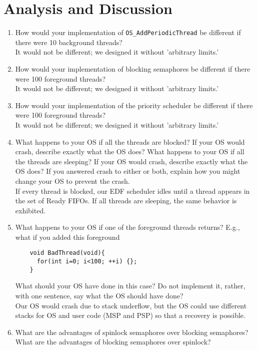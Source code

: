 \documentclass[12pt]{article}
\begin{document}
\section{Analysis and Discussion}

\begin{enumerate}[1)]
\item How would your implementation of \verb|OS_AddPeriodicThread| be
  different if there were 10 background threads? \\
  It would not be different; we designed it without 'arbitrary limits.'
\item How would your implementation of blocking semaphores be
  different if there were 100 foreground threads? \\
  It would not be different; we designed it without 'arbitrary limits.'
\item How would your implementation of the priority scheduler be
  different if there were 100 foreground threads? \\
  It would not be different; we designed it without 'arbitrary limits.'
\item What happens to your OS if all the threads are blocked? If your
  OS would crash, describe exactly what the OS does? What happens to
  your OS if all the threads are sleeping? If your OS would crash,
  describe exactly what the OS does? If you answered crash to either
  or both, explain how you might change your OS to prevent the crash. \\
  If every thread is blocked, our EDF scheduler idles until a thread
  appears in the set of Ready FIFOs. If all threads are sleeping, the
  same behavior is exhibited.
\item What happens to your OS if one of the foreground threads
  returns? E.g., what if you added this foreground
  \begin{verbatim}
    void BadThread(void){
      for(int i=0; i<100; ++i) {};
    }
  \end{verbatim}
  What should your OS have done in this case? Do not implement it,
  rather, with one sentence, say what the OS should have done? \\
  Our OS would crash due to stack underflow, but the OS could use
  different stacks for OS and user code (MSP and PSP) so that a
  recovery is possible.
\item What are the advantages of spinlock semaphores over blocking
  semaphores? What are the advantages of blocking semaphores over
  spinlock? \\

\end{enumerate}
\end{document}
